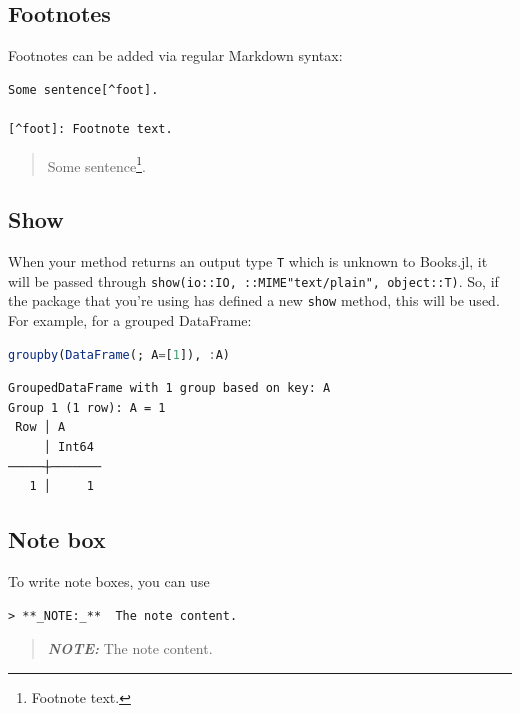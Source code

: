 \documentclass[
  notoc %
]{tufte-book}
\newcommand{\passthrough}[1]{#1}
\begin{document}
\hypertarget{footnotes}{%
\subsection{Footnotes}\label{footnotes}}

Footnotes can be added via regular Markdown syntax:

\begin{lstlisting}
Some sentence[^foot].

[^foot]: Footnote text.
\end{lstlisting}

\begin{quote}
Some sentence\footnote{Footnote text.}.
\end{quote}

\hypertarget{show}{%
\subsection{Show}\label{show}}

When your method returns an output type \passthrough{\lstinline!T!}
which is unknown to Books.jl, it will be passed through
\passthrough{\lstinline!show(io::IO, ::MIME"text/plain", object::T)!}.
So, if the package that you're using has defined a new
\passthrough{\lstinline!show!} method, this will be used. For example,
for a grouped DataFrame:

\begin{lstlisting}[language=Julia]
groupby(DataFrame(; A=[1]), :A)
\end{lstlisting}

\begin{lstlisting}[language=Output]
GroupedDataFrame with 1 group based on key: A
Group 1 (1 row): A = 1
 Row │ A
     │ Int64
─────┼───────
   1 │     1
\end{lstlisting}

\hypertarget{note-box}{%
\subsection{Note box}\label{note-box}}

To write note boxes, you can use

\begin{lstlisting}
> **_NOTE:_**  The note content.
\end{lstlisting}

\begin{quote}
\textbf{\emph{NOTE:}} The note content.
\end{quote}
\end{document}
